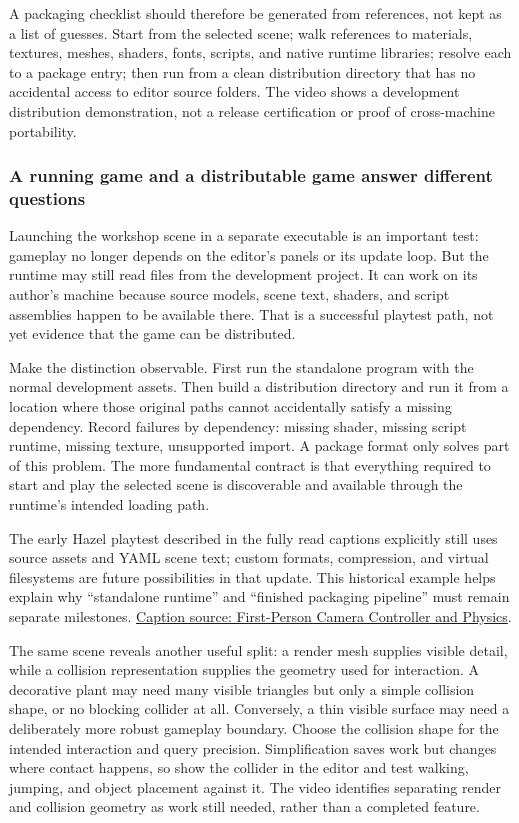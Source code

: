 A packaging checklist should therefore be generated from references, not kept as a list of guesses. Start from the selected scene; walk references to materials, textures, meshes, shaders, fonts, scripts, and native runtime libraries; resolve each to a package entry; then run from a clean distribution directory that has no accidental access to editor source folders. The video shows a development distribution demonstration, not a release certification or proof of cross-machine portability.

\subsubsection{A running game and a distributable game answer different questions}\label{06-engine-ii-ch032-a-running-game-and-a-distributable-game-answer-different-questions}

Launching the workshop scene in a separate executable is an important test: gameplay no longer depends on the editor's panels or its update loop. But the runtime may still read files from the development project. It can work on its author's machine because source models, scene text, shaders, and script assemblies happen to be available there. That is a successful playtest path, not yet evidence that the game can be distributed.

Make the distinction observable. First run the standalone program with the normal development assets. Then build a distribution directory and run it from a location where those original paths cannot accidentally satisfy a missing dependency. Record failures by dependency: missing shader, missing script runtime, missing texture, unsupported import. A package format only solves part of this problem. The more fundamental contract is that everything required to start and play the selected scene is discoverable and available through the runtime's intended loading path.

The early Hazel playtest described in the fully read captions explicitly still uses source assets and YAML scene text; custom formats, compression, and virtual filesystems are future possibilities in that update. This historical example helps explain why ``standalone runtime'' and ``finished packaging pipeline'' must remain separate milestones. \href{https://www.youtube.com/watch?v=nVZM2zSXaiY}{Caption source: First-Person Camera Controller and Physics}.

The same scene reveals another useful split: a render mesh supplies visible detail, while a collision representation supplies the geometry used for interaction. A decorative plant may need many visible triangles but only a simple collision shape, or no blocking collider at all. Conversely, a thin visible surface may need a deliberately more robust gameplay boundary. Choose the collision shape for the intended interaction and query precision. Simplification saves work but changes where contact happens, so show the collider in the editor and test walking, jumping, and object placement against it. The video identifies separating render and collision geometry as work still needed, rather than a completed feature.


